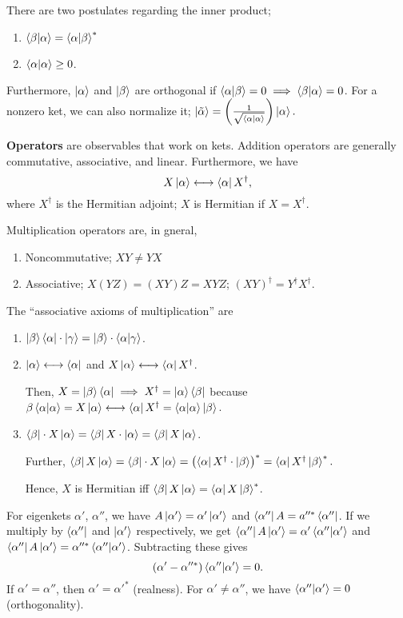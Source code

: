 \documentclass{article}
\begin{document}
There are two postulates regarding the inner product; 
\begin{enumerate}
    \item $\braket{\beta}{\alpha}=\braket{\alpha}{\beta}^*$
    \item $\braket{\alpha}{\alpha}\ge 0$.
\end{enumerate}
Furthermore, $\ket\alpha$ and $\ket\beta$ are orthogonal if $\braket{\alpha}{\beta}=0\implies\braket{\beta}{\alpha}=0$. For a nonzero ket, we can also normalize it; $\ket{\tilde\alpha}=\left(\frac 1{\sqrt{\braket\alpha}}\right)\ket\alpha.$

\textbf{Operators} are observables that work on kets. Addition operators are generally commutative, associative, and linear. Furthermore, we have 
$$X\ket\alpha\longleftrightarrow\bra\alpha X^\dag,$$
where $X^\dag$ is the Hermitian adjoint; $X$ is Hermitian if $X=X^\dag$.

Multiplication operators are, in gneral,
\begin{enumerate}
    \item Noncommutative; $XY\ne YX$
    \item Associative; $X(YZ)=(XY)Z=XYZ$; $(XY)^\dag=Y^\dag X^\dag$. 
\end{enumerate}
The ``associative axioms of multiplication'' are
\begin{enumerate}
    \item $\ket\beta\bra\alpha\cdot\ket\gamma=\ket\beta\cdot\braket{\alpha}{\gamma}$.
    \item $\ket\alpha\longleftrightarrow\bra\alpha$ and $X\ket\alpha\longleftrightarrow\bra\alpha X^\dag$. 
    
    Then, $X=\ket\beta\bra\alpha\implies X^\dag=\ket\alpha\bra\beta$ because $\beta\braket\alpha=X\ket\alpha\longleftrightarrow\bra\alpha X^\dag=\braket\alpha\ket\beta$.
    \item $\bra\beta\cdot X\ket\alpha=\bra\beta X\cdot\ket\alpha=\bra\beta X\ket\alpha$.

    Further, $\bra\beta X\ket\alpha=\bra\beta\cdot X\ket\alpha=\left(\bra\alpha X^\dag\cdot\ket\beta\right)^*=\bra\alpha X^\dag\ket\beta^*.$

    Hence, $X$ is Hermitian iff $\bra\beta X\ket\alpha=\bra\alpha X\ket\beta^*$.
\end{enumerate}


For eigenkets $\alpha'$, $\alpha''$, we have $A\ket{\alpha'}=\alpha'\ket{\alpha'}$ and $\bra{\alpha''}A=a''^*\bra{\alpha''}$. If we multiply by $\bra{\alpha''}$ and $\ket{\alpha'}$ respectively, we get $\bra{\alpha''}A\ket{\alpha'}=\alpha'\braket{\alpha''}{\alpha'}$ and $\bra{\alpha''}A\ket{\alpha'}=\alpha''^*\braket{\alpha''}{\alpha'}$. Subtracting these gives
$$(\alpha'-\alpha''^*)\braket{\alpha''}{\alpha'}=0.$$
If $\alpha'=\alpha''$, then $\alpha'=\alpha'^*$ (realness). For $\alpha'\ne\alpha''$, we have $\braket{\alpha''}{\alpha'}=0$ (orthogonality).
\end{document}
